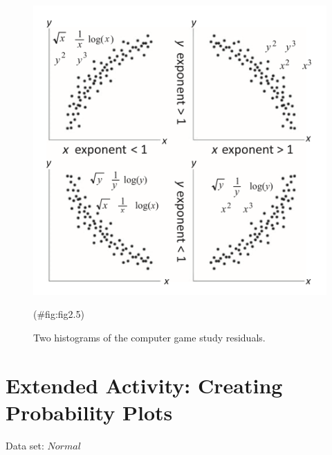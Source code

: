 \documentclass[
]{report}
\begin{document}
\begin{figure}

{\centering \includegraphics[width=1\linewidth]{docs/Fig2_5} 

}

\caption{Two histograms of the computer game study residuals.}(\#fig:fig2.5)
\end{figure}

\section*{Extended Activity: Creating Probability Plots}\label{extended-activity-creating-probability-plots}

Data set: \(Normal\)
\end{document}
